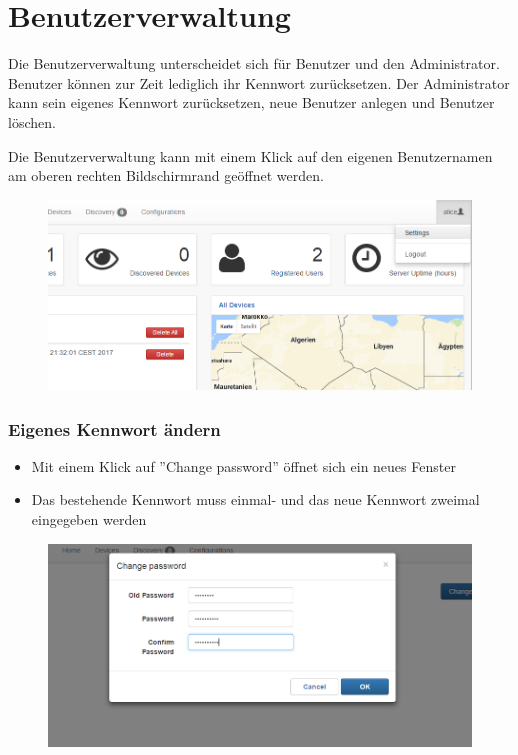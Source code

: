 \section{Benutzerverwaltung}
Die Benutzerverwaltung unterscheidet sich für Benutzer und den Administrator. Benutzer können zur Zeit lediglich ihr Kennwort zurücksetzen. Der Administrator kann sein eigenes Kennwort zurücksetzen, neue Benutzer anlegen und Benutzer löschen.

Die Benutzerverwaltung kann mit einem Klick auf den eigenen Benutzernamen am oberen rechten Bildschirmrand geöffnet werden.
\begin{figure}[H]
\includegraphics[scale=0.65]{../05_Schlussbericht/images/benutzeranleitung/usersettings.png}
\end{figure}

\subsubsection{Eigenes Kennwort ändern}
\begin{itemize}
\item Mit einem Klick auf ''Change password'' öffnet sich ein neues Fenster
\item Das bestehende Kennwort muss einmal- und das neue Kennwort zweimal eingegeben werden
\end{itemize}

\begin{figure}[H]
\includegraphics[scale=0.65]{../05_Schlussbericht/images/benutzeranleitung/change_password.png}
\end{figure}
\newpage

